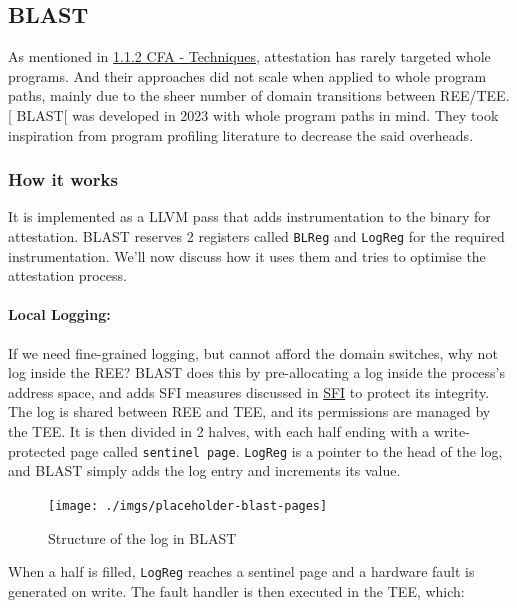 \documentclass[a4paper, nobind]{templates/ociamthesis}
\begin{document}
\subsection{BLAST}\label{blast}

As mentioned in \hyperref[cfatechniques]{1.1.2 CFA - Techniques}, attestation has rarely targeted whole programs.
And their approaches did not scale when applied to whole program paths, mainly
due to the sheer number of domain transitions between REE/TEE.{[}\citeproc{ref-blast}{26}{]}
BLAST{[}\citeproc{ref-blast}{26}{]} was developed in 2023 with whole program paths in mind.
They took inspiration from program profiling literature to decrease the said overheads.

\subsubsection{How it works}\label{how-it-works}

It is implemented as a LLVM pass that adds instrumentation to the binary for attestation.
BLAST reserves 2 registers called \texttt{BLReg} and \texttt{LogReg} for the required instrumentation.
We'll now discuss how it uses them and tries to optimise the attestation process.

\paragraph{Local Logging:}\label{local-logging}

If we need fine-grained logging, but cannot afford the domain switches, why not log inside the REE?
BLAST does this by pre-allocating a log inside the process's address space,
and adds SFI measures discussed in \hyperref[blastsfi]{SFI} to protect its integrity.
The log is shared between REE and TEE, and its permissions are managed by the TEE.
It is then divided in 2 halves, with each half ending with a write-protected page called \texttt{sentinel\ page}.
\texttt{LogReg} is a pointer to the head of the log, and BLAST simply adds the log entry
and increments its value.

\begin{figure}[H]

{\centering \texttt{[image: ./imgs/placeholder-blast-pages]} 

}

\caption{Structure of the log in BLAST}\label{fig:blast-log-pages}
\end{figure}

When a half is filled, \texttt{LogReg} reaches a sentinel page and a hardware fault is generated on write.
The fault handler is then executed in the TEE, which:
\end{document}
